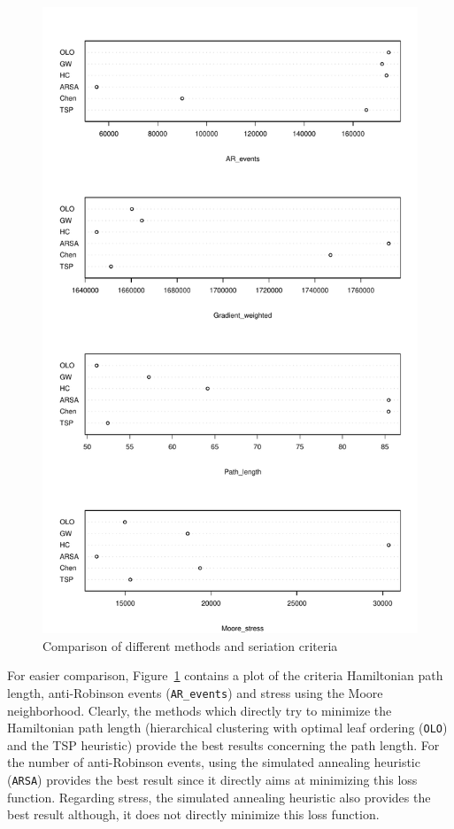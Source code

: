 \documentclass[fleqn, a4paper]{article}
\newcommand{\code}[1]{\mbox{\texttt{#1}}}
\begin{document}
\begin{figure}
    \centering
    \includegraphics{seriation-crit1}
    \caption{Comparison of different methods and seriation criteria}
    \label{fig:crit1}
\end{figure}

For easier comparison, Figure~\ref{fig:crit1} contains a plot of the criteria
Hamiltonian path length, anti-Robinson events (\code{AR\_events}) and stress
using the Moore neighborhood. Clearly, the methods which directly try to
minimize the Hamiltonian path length (hierarchical clustering with optimal leaf
ordering (\code{OLO}) and the TSP heuristic) provide the best results
concerning the path length. For the number of anti-Robinson events, using the
simulated annealing heuristic (\code{ARSA}) provides the best result since it
directly aims at minimizing this loss function.  Regarding stress, the
simulated annealing heuristic also provides the best result although, it does
not directly minimize this loss function.
\end{document}
